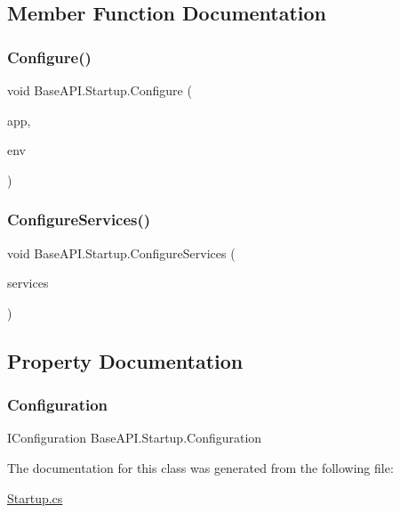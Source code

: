 \subsection{Member Function Documentation}
\mbox{\label{class_base_a_p_i_1_1_startup_ae23537a591741af2a1f5373940dd57aa}} 
\subsubsection{\texorpdfstring{Configure()}{Configure()}}
{\footnotesize\ttfamily void Base\+A\+P\+I.\+Startup.\+Configure (\begin{DoxyParamCaption}\item[{I\+Application\+Builder}]{app,  }\item[{I\+Hosting\+Environment}]{env }\end{DoxyParamCaption})}

\mbox{\label{class_base_a_p_i_1_1_startup_a7ab4aad9aeb84d3d30173f614f7ac4d8}} 
\subsubsection{\texorpdfstring{ConfigureServices()}{ConfigureServices()}}
{\footnotesize\ttfamily void Base\+A\+P\+I.\+Startup.\+Configure\+Services (\begin{DoxyParamCaption}\item[{I\+Service\+Collection}]{services }\end{DoxyParamCaption})}



\subsection{Property Documentation}
\mbox{\label{class_base_a_p_i_1_1_startup_aa0f28c8943cbe92fd297cf532576e172}} 
\subsubsection{\texorpdfstring{Configuration}{Configuration}}
{\footnotesize\ttfamily I\+Configuration Base\+A\+P\+I.\+Startup.\+Configuration\hspace{0.3cm}{\ttfamily [get]}}



The documentation for this class was generated from the following file\+:\begin{DoxyCompactItemize}
\item 
\mbox{\hyperlink{_startup_8cs}{Startup.\+cs}}\end{DoxyCompactItemize}
